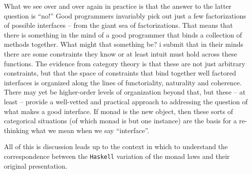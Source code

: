 What we see over and over again in practice is that the answer to
the latter question is ``no!'' Good programmers invariably pick out just a
few factorizations of possible interfaces -- from the giant sea of
factorizations. That means that there is something in the mind of a
good programmer that binds a collection of methods together. What
might that something be? i submit that in their minds there are some
constraints they know or at least intuit must hold across these
functions. The evidence from category theory is that these are not
just arbitrary constraints, but that the space of constraints that
bind together well factored interfaces is organized along the lines of
functoriality, naturality and coherence. There may yet be higher-order
levels of organization beyond that, but these -- at least -- provide a
well-vetted and practical approach to addressing the question of what
makes a good interface. If monad is the new object, then these sorts
of categorical situations (of which monad is but one instance) are the
basis for a re-thinking what we mean when we say ``interface''.

All of this is discussion leads up to the context in which to
understand the correspondence between the \texttt{Haskell} variation
of the monad laws and their original presentation. 








